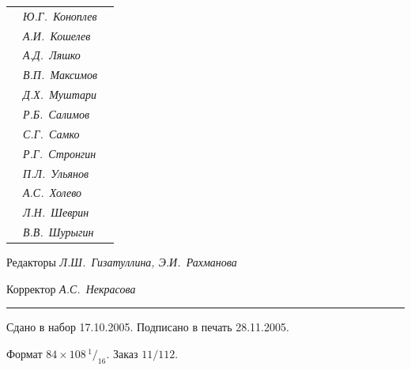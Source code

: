 \begin{tabular}{p{63mm}p{40mm}p{50mm}}
                               &   \it Ю.Г.~Коноплев & \\


                               &   \it А.И.~Кошелев  & \\


                               &   \it А.Д.~Ляшко  & \\


                               &   \it В.П.~Максимов  & \\


                               &   \it Д.Х.~Муштари & \\


                               &   \it Р.Б.~Салимов  & \\


                               &   \it С.Г.~Самко  & \\


                               &   \it Р.Г.~Стронгин  & \\


                               &   \it П.Л.~Ульянов  & \\


                               &   \it А.С.~Холево  & \\


                               &   \it Л.Н.~Шеврин  & \\


                               &   \it В.В.~Шурыгин  & \\


\end{tabular} 


\bigskip 


\bigskip 


\bigskip 





 


\centerline{Редакторы \it Л.Ш.~Гизатуллина, Э.И.~Рахманова}


\centerline{Корректор \it А.С.~Некрасова}


\bigskip 


\hrule 


\setlength{\hoffset}{-23mm}


\bigskip


\noindent Сдано в набор 17.10.2005. Подписано в печать 28.11.2005.


Формат $84\times 108 \,^1/_{16}.$ Заказ $11/112$.\\


